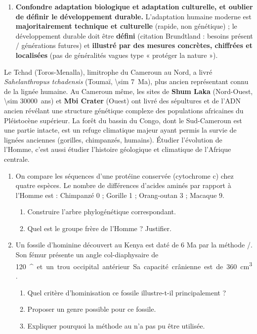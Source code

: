 \documentclass[11pt]{article}
\providecommand{\degree}{^{\circ}}
\begin{document}
\begin{attention}
\begin{enumerate}
\item \textbf{Confondre adaptation biologique et adaptation culturelle, et oublier de définir le développement durable.} L'adaptation humaine moderne est \textbf{majoritairement technique et culturelle} (rapide, non génétique) ; le développement durable doit être \textbf{défini} (citation Brundtland : besoins présent / générations futures) et \textbf{illustré par des mesures concrètes, chiffrées et localisées} (pas de généralités vagues type « protéger la nature »).
\end{enumerate}
\end{attention}

\begin{savaistu}
Le Tchad (Toros-Menalla), limitrophe du Cameroun au Nord, a livré \emph{Sahelanthropus tchadensis} (Toumaï, \SI{\sim 7}{Ma}), plus ancien représentant connu de la lignée humaine. Au Cameroun même, les sites de \textbf{Shum Laka} (Nord-Ouest, \SI{\sim 30000}{ans}) et \textbf{Mbi Crater} (Ouest) ont livré des sépultures et de l'ADN ancien révélant une structure génétique complexe des populations africaines du Pléistocène supérieur. La forêt du bassin du Congo, dont le Sud-Cameroun est une partie intacte, est un refuge climatique majeur ayant permis la survie de lignées anciennes (gorilles, chimpanzés, humains). Étudier l'évolution de l'Homme, c'est aussi étudier l'histoire géologique et climatique de l'Afrique centrale.
\end{savaistu}

\begin{exercice}
\begin{enumerate}
\item On compare les séquences d'une protéine conservée (cytochrome c) chez quatre espèces. Le nombre de différences d'acides aminés par rapport à l'Homme est : Chimpanzé 0 ; Gorille 1 ; Orang-outan 3 ; Macaque 9.
\begin{enumerate}
\item Construire l'arbre phylogénétique correspondant.
\item Quel est le groupe frère de l'Homme ? Justifier.
\end{enumerate}
\item Un fossile d'hominine découvert au Kenya est daté de 6 Ma par la méthode /. Son fémur présente un angle col-diaphysaire de \SI{120}{\degree} et un trou occipital antérieur. Sa capacité crânienne est de \SI{360}{cm^3}.
\begin{enumerate}
\item Quel critère d'hominisation ce fossile illustre-t-il principalement ?
\item Proposer un genre possible pour ce fossile.
\item Expliquer pourquoi la méthode au  n'a pas pu être utilisée.
\end{enumerate}
\end{enumerate}
\end{exercice}
\end{document}
